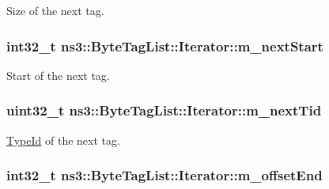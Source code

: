 Size of the next tag. 

\subsubsection[{\texorpdfstring{m\+\_\+next\+Start}{m_nextStart}}]{\setlength{\rightskip}{0pt plus 5cm}int32\+\_\+t ns3\+::\+Byte\+Tag\+List\+::\+Iterator\+::m\+\_\+next\+Start\hspace{0.3cm}{\ttfamily [private]}}\hypertarget{classns3_1_1ByteTagList_1_1Iterator_a6b24dab16b41ceda94847795a556c29b}{}\label{classns3_1_1ByteTagList_1_1Iterator_a6b24dab16b41ceda94847795a556c29b}


Start of the next tag. 

\subsubsection[{\texorpdfstring{m\+\_\+next\+Tid}{m_nextTid}}]{\setlength{\rightskip}{0pt plus 5cm}uint32\+\_\+t ns3\+::\+Byte\+Tag\+List\+::\+Iterator\+::m\+\_\+next\+Tid\hspace{0.3cm}{\ttfamily [private]}}\hypertarget{classns3_1_1ByteTagList_1_1Iterator_af0da490a20b9003e24e8aae05a49e6cc}{}\label{classns3_1_1ByteTagList_1_1Iterator_af0da490a20b9003e24e8aae05a49e6cc}


\hyperlink{classns3_1_1TypeId}{Type\+Id} of the next tag. 

\subsubsection[{\texorpdfstring{m\+\_\+offset\+End}{m_offsetEnd}}]{\setlength{\rightskip}{0pt plus 5cm}int32\+\_\+t ns3\+::\+Byte\+Tag\+List\+::\+Iterator\+::m\+\_\+offset\+End\hspace{0.3cm}{\ttfamily [private]}}\hypertarget{classns3_1_1ByteTagList_1_1Iterator_a1c1d1db54dc1eae50373416f74bfd814}{}\label{classns3_1_1ByteTagList_1_1Iterator_a1c1d1db54dc1eae50373416f74bfd814}


